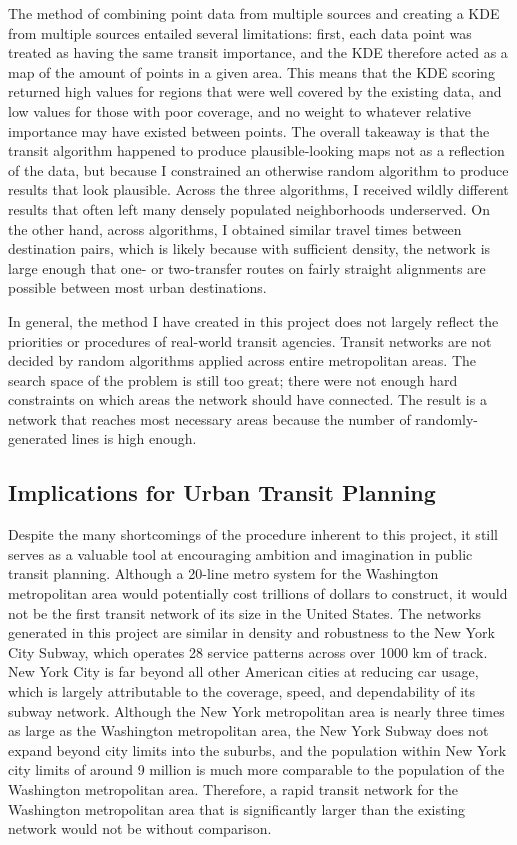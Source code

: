 \documentclass[manuscript]{acmart}
\begin{document}
The method of combining point data from multiple sources and creating a KDE from multiple sources entailed several limitations: first, each data point was treated as having the same transit importance, and the KDE therefore acted as a map of the amount of points in a given area. This means that the KDE scoring returned high values for regions that were well covered by the existing data, and low values for those with poor coverage, and no weight to whatever relative importance may have existed between points. The overall takeaway is that the transit algorithm happened to produce plausible-looking maps not as a reflection of the data, but because I constrained an otherwise random algorithm to produce results that look plausible. Across the three algorithms, I received wildly different results that often left many densely populated neighborhoods underserved. On the other hand, across algorithms, I obtained similar travel times between destination pairs, which is likely because with sufficient density, the network is large enough that one- or two-transfer routes on fairly straight alignments are possible between most urban destinations.

In general, the method I have created in this project does not largely reflect the priorities or procedures of real-world transit agencies. Transit networks are not decided by random algorithms applied across entire metropolitan areas. The search space of the problem is still too great; there were not enough hard constraints on which areas the network should have connected. The result is a network that reaches most necessary areas because the number of randomly-generated lines is high enough. 

\subsection{Implications for Urban Transit Planning}
Despite the many shortcomings of the procedure inherent to this project, it still serves as a valuable tool at encouraging ambition and imagination in public transit planning. Although a 20-line metro system for the Washington metropolitan area would potentially cost trillions of dollars to construct, it would not be the first transit network of its size in the United States. The networks generated in this project are similar in density and robustness to the New York City Subway, which operates 28 service patterns across over 1000 km of track. New York City is far beyond all other American cities at reducing car usage, which is largely attributable to the coverage, speed, and dependability of its subway network. Although the New York metropolitan area is nearly three times as large as the Washington metropolitan area, the New York Subway does not expand beyond city limits into the suburbs, and the population within New York city limits of around 9 million is much more comparable to the population of the Washington metropolitan area. Therefore, a rapid transit network for the Washington metropolitan area that is significantly larger than the existing network would not be without comparison. 
\end{document}
